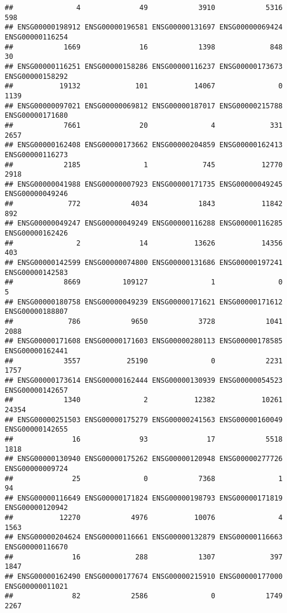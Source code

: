 \documentclass[
]{article}
\begin{document}
\begin{verbatim}
##               4              49            3910            5316             598 
## ENSG00000198912 ENSG00000196581 ENSG00000131697 ENSG00000069424 ENSG00000116254 
##            1669              16            1398             848              30 
## ENSG00000116251 ENSG00000158286 ENSG00000116237 ENSG00000173673 ENSG00000158292 
##           19132             101           14067               0            1139 
## ENSG00000097021 ENSG00000069812 ENSG00000187017 ENSG00000215788 ENSG00000171680 
##            7661              20               4             331            2657 
## ENSG00000162408 ENSG00000173662 ENSG00000204859 ENSG00000162413 ENSG00000116273 
##            2185               1             745           12770            2918 
## ENSG00000041988 ENSG00000007923 ENSG00000171735 ENSG00000049245 ENSG00000049246 
##             772            4034            1843           11842             892 
## ENSG00000049247 ENSG00000049249 ENSG00000116288 ENSG00000116285 ENSG00000162426 
##               2              14           13626           14356             403 
## ENSG00000142599 ENSG00000074800 ENSG00000131686 ENSG00000197241 ENSG00000142583 
##            8669          109127               1               0               5 
## ENSG00000180758 ENSG00000049239 ENSG00000171621 ENSG00000171612 ENSG00000188807 
##             786            9650            3728            1041            2088 
## ENSG00000171608 ENSG00000171603 ENSG00000280113 ENSG00000178585 ENSG00000162441 
##            3557           25190               0            2231            1757 
## ENSG00000173614 ENSG00000162444 ENSG00000130939 ENSG00000054523 ENSG00000142657 
##            1340               2           12382           10261           24354 
## ENSG00000251503 ENSG00000175279 ENSG00000241563 ENSG00000160049 ENSG00000142655 
##              16              93              17            5518            1818 
## ENSG00000130940 ENSG00000175262 ENSG00000120948 ENSG00000277726 ENSG00000009724 
##              25               0            7368               1              94 
## ENSG00000116649 ENSG00000171824 ENSG00000198793 ENSG00000171819 ENSG00000120942 
##           12270            4976           10076               4            1563 
## ENSG00000204624 ENSG00000116661 ENSG00000132879 ENSG00000116663 ENSG00000116670 
##              16             288            1307             397            1847 
## ENSG00000162490 ENSG00000177674 ENSG00000215910 ENSG00000177000 ENSG00000011021 
##              82            2586               0            1749            2267 

\end{verbatim}
\end{document}
